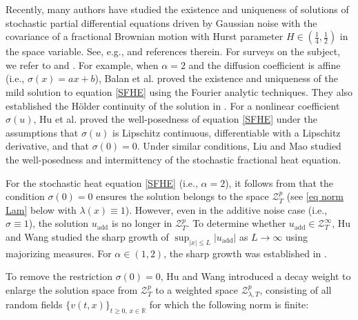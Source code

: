 \documentclass[11pt,reqno]{amsart}
\numberwithin{equation}{section}
\newcommand{\1}{{\bf 1}}
\newcommand{\2}{{\bf 2}}
\begin{document}
         Recently, many authors have studied the existence and uniqueness of solutions of stochastic partial differential equations driven by Gaussian noise with the covariance of a fractional Brownian motion with Hurst parameter $H\in (\frac1 4, \frac12)$ in the space variable. See, e.g., \cite{HHLNT2017, HHLNT2018, HW2022, LHW2022, SongSX2020} and references therein. For surveys on the subject, we refer to \cite{Hu19} and \cite{Song2018}.  For example, when $\alpha=2$ and  the diffusion coefficient is affine (i.e.,   $\sigma(x)=ax+b$), Balan et al.   \cite{BJQ2015} proved the existence and uniqueness of the mild solution to  equation \eqref{SFHE} using the Fourier analytic techniques.  They also established the H\"older continuity of the solution in \cite{BJQ2016}.  For  a nonlinear coefficient $\sigma(u)$,  Hu et al. \cite{HHLNT2017}  proved the well-posedness of  equation \eqref{SFHE} under the assumptions that  $\sigma(u)$ is Lipschitz continuous,  differentiable with  a Lipschitz  derivative, and that $\sigma(0)=0$.  Under similar conditions,  Liu and Mao \cite{LM2022} studied the well-posedness and intermittency of  the stochastic fractional heat equation.
   
          For the stochastic heat equation \eqref{SFHE} (i.e., $\alpha=2$), it follows from  \cite[Theorem 4.5]{HHLNT2017} that  the condition $\sigma(0)=0$ ensures  the solution belongs to the space $\mathcal{Z}_T^p$ (see \eqref{eq norm Lam}  below with $\lambda(x)\equiv 1$). However,  even in the additive noise case (i.e.,  $\sigma\equiv 1$), the solution $u_{\text{add}}$ is no longer in $\mathcal{Z}_T^p$. To determine whether $u_{\text{add}}\in\mathcal{Z}_T^\infty$, Hu and Wang \cite{HW2022} studied the sharp growth of $\sup_{|x|\le L}|u_{\text{add}}|$ as $L\to\infty$ using majorizing measures. For $\alpha\in(1,2)$, the sharp growth was established in \cite{LQW25}.

To remove the restriction $\sigma(0)=0$, Hu and Wang \cite{HW2022} introduced a decay weight to enlarge the solution space from $\mathcal{Z}_T^p$ to a weighted space $\mathcal{Z}_{\lambda,T}^p$,  consisting of all random fields $\{v(t,x)\}_{t\ge0,\,x\in\mathbb{R}}$ for which  the following norm is finite:
\end{document}
